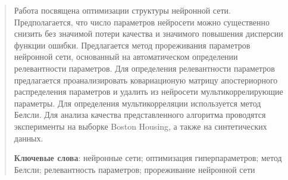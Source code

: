 \newpage


\begin{abstract}
Работа посвящена оптимизации структуры нейронной сети. Предполагается, что число параметров нейросети можно существенно снизить без значимой потери качества
и значимого повышения дисперсии функции ошибки. Предлагается метод прореживания параметров нейронной сети, основанный на автоматическом определении релевантности параметров. Для определения релевантности параметров предлагается проанализировать ковариационую матрицу апостериорного распределения параметров и удалить из нейросети
мультикоррелирующие параметры. Для определения мультикорреляции используется метод Белсли. Для анализа качества представленного алгоритма проводятся эксперименты на выборке Boston Housing, а также на синтетических данных.



\smallskip
\textbf{Ключевые слова}: нейронные сети; оптимизация гиперпараметров; метод Белсли; релевантность параметров; прореживание нейронной сети
\end{abstract}




